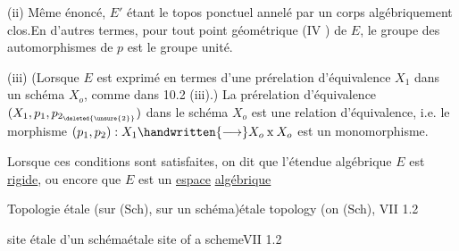 (ii) Même énoncé, $E'$ étant le topos ponctuel annelé par un corps algébriquement clos.En d'autres termes, pour tout point géométrique (IV ) de $E$, le groupe des automorphismes de $p$ est le groupe unité.
\margin{\handwritten{$\times$}}

(iii) (Lorsque $E$ est exprimé en termes d'une prérelation d'équivalence  $X_1$ dans un schéma $X_o$, comme dans 10.2 (iii).) La prérelation d'équivalence $(X_1,p_1,p_{2_{\deleted{\unsure{2}}}})$ dans le schéma $X_o$ est une relation d'équivalence, i.e. le morphisme $(p_1,p_2):X_1\handwritten{\longrightarrow}X_o\mathbin{\mathrm{x}}X_o$ est un monomorphisme.

Lorsque ces conditions sont satisfaites, on dit que l'étendue algébrique $E$ est \uline{rigide}, ou encore que $E$ est un \uline{espace} \uline{algébrique} \handwritten{(*)}




Topologie étale (sur (Sch), sur un schéma)\quad étale topology (on (Sch), \handwritten{)}\quad VII 1.2

site étale d'un schéma\quad étale site of a scheme\quad VII 1.2

